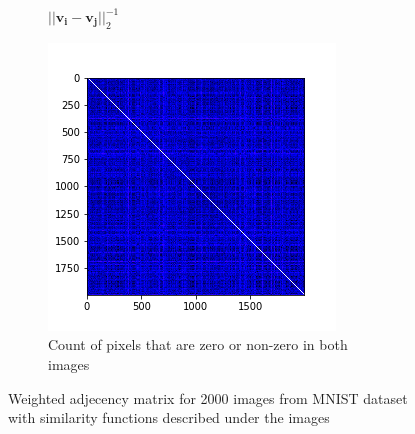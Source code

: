 \documentclass[10pt,a4paper, nocenter]{report}
\begin{document}
\begin{enumerate}
\begin{figure}[h]
\begin{center}
\begin{subfigure}[b]{0.3\textwidth}
                    \caption{$\lvert \lvert \mathbf{v_i} - \mathbf{v_j} \rvert \rvert_2^{-1}$ \vspace{10pt} }
                    \label{fig:w_2norm}
                \end{subfigure}           
                \begin{subfigure}[b]{0.3\textwidth}
                    \centering
                    \includegraphics[width=\textwidth]{../../images/w_hamming.png}
                    \caption{Count of pixels that are zero or non-zero in both images}
                    \label{fig:w_hamming}
                \end{subfigure}           
            \end{center}
            \caption{Weighted adjecency matrix for 2000 images from MNIST dataset with similarity functions described under the images}
            \label{fig:mnistWImages}
        \end{figure}



\end{enumerate}
\end{document}
